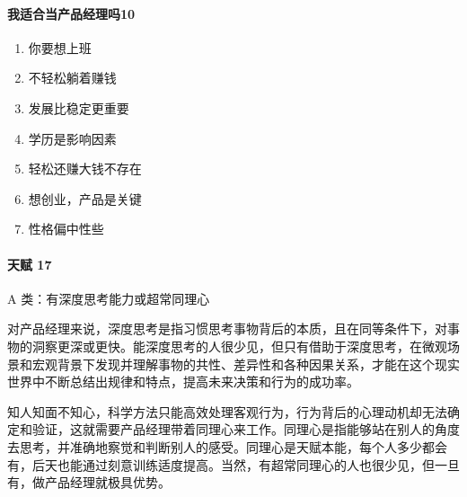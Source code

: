 \documentclass[letterpaper,11pt,english]{sphinxmanual}
\begin{document}
\paragraph{我适合当产品经理吗10\sphinxfootnotemark[61]}
\label{\detokenize{chapter_introduction/PM:id22}}%
\begin{footnotetext}[61]\sphinxAtStartFootnote
{}
%
\end{footnotetext}\ignorespaces \begin{enumerate}
%
\item {} 
你要想上班

\item {} 
不轻松躺着赚钱

\item {} 
发展比稳定更重要

\item {} 
学历是影响因素

\item {} 
轻松还赚大钱不存在

\item {} 
想创业，产品是关键

\item {} 
性格偏中性些

\end{enumerate}


\paragraph{天赋 17\sphinxfootnotemark[62]}
\label{\detokenize{chapter_introduction/PM:id23}}%
\begin{footnotetext}[62]\sphinxAtStartFootnote
{}
%
\end{footnotetext}\ignorespaces 
A 类：有深度思考能力或超常同理心

对产品经理来说，深度思考是指习惯思考事物背后的本质，且在同等条件下，对事物的洞察更深或更快。能深度思考的人很少见，但只有借助于深度思考，在微观场景和宏观背景下发现并理解事物的共性、差异性和各种因果关系，才能在这个现实世界中不断总结出规律和特点，提高未来决策和行为的成功率。

知人知面不知心，科学方法只能高效处理客观行为，行为背后的心理动机却无法确定和验证，这就需要产品经理带着同理心来工作。同理心是指能够站在别人的角度去思考，并准确地察觉和判断别人的感受。同理心是天赋本能，每个人多少都会有，后天也能通过刻意训练适度提高。当然，有超常同理心的人也很少见，但一旦有，做产品经理就极具优势。
\end{document}
